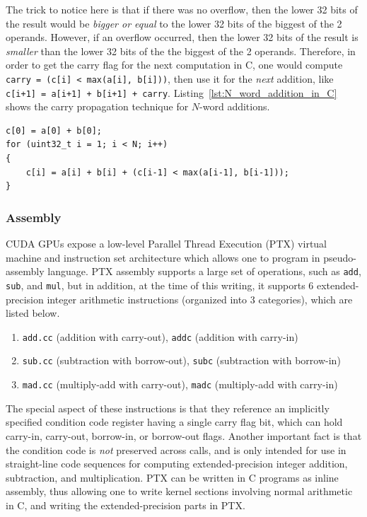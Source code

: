 \documentclass[10pt, a4paper]{report}
\begin{document}
The trick to notice here is that if there was no overflow, then the lower 32
bits of the result would be \emph{bigger or equal} to the lower 32 bits of the
biggest of the 2 operands.
However, if an overflow occurred, then the lower 32 bits of the result is
\emph{smaller} than the lower 32 bits of the the biggest of the 2 operands.
Therefore, in order to get the carry flag for the next computation in C, one
would compute \verb!carry = (c[i] < max(a[i], b[i]))!, then use it for the
\emph{next} addition, like \verb!c[i+1] = a[i+1] + b[i+1] + carry!.
Listing~\ref{lst:N_word_addition_in_C} shows the carry propagation technique for
$N$-word additions.

\begin{lstlisting}
c[0] = a[0] + b[0];
for (uint32_t i = 1; i < N; i++)
{
    c[i] = a[i] + b[i] + (c[i-1] < max(a[i-1], b[i-1]));
}
\end{lstlisting}

\subsubsection{Assembly}
CUDA GPUs expose a low-level Parallel Thread Execution (PTX) virtual
machine and instruction set architecture which allows one to program in
pseudo-assembly language.
PTX assembly supports a large set of operations, such as \verb+add+, \verb+sub+,
and \verb+mul+, but in addition, at the time of this writing, it supports 6
extended-precision integer arithmetic instructions (organized into 3
categories), which are listed below.

\begin{enumerate}
\item \verb+add.cc+ (addition with carry-out), \verb+addc+ (addition with
carry-in)
\item \verb+sub.cc+ (subtraction with borrow-out), \verb+subc+ (subtraction with
borrow-in)
\item \verb+mad.cc+ (multiply-add with carry-out), \verb+madc+ (multiply-add
with carry-in)
\end{enumerate}

The special aspect of these instructions is that they reference an implicitly
specified condition code register having a single carry flag bit, which can hold
carry-in, carry-out, borrow-in, or borrow-out flags.
Another important fact is that the condition code is \emph{not} preserved across
calls, and is only intended for use in straight-line code sequences for
computing extended-precision integer addition, subtraction, and multiplication.
PTX can be written in C programs as inline assembly, thus allowing one to write
kernel sections involving normal arithmetic in C, and writing the
extended-precision parts in PTX.
\end{document}
